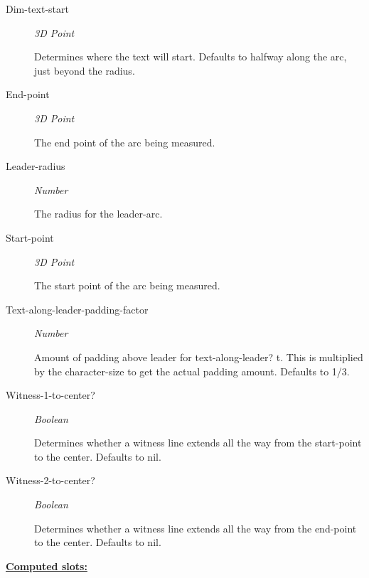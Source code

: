\documentclass [11pt]{book}
\begin{document}
\begin{itemize}
\begin{description}
\item [Dim-text-start]
\emph{3D Point}

 Determines where the text will start. Defaults to halfway along the arc, just beyond the radius.




\item [End-point]
\emph{3D Point}

 The end point of the arc being measured.




\item [Leader-radius]
\emph{Number}

 The radius for the leader-arc.




\item [Start-point]
\emph{3D Point}

 The start point  of the arc being measured.




\item [Text-along-leader-padding-factor]
\emph{Number}

 Amount of padding above leader for text-along-leader? t. This is multiplied by the
character-size to get the actual padding amount. Defaults to 1/3.




\item [Witness-1-to-center?]
\emph{Boolean}

 Determines whether a witness line extends all the way from the start-point to the center.
Defaults to nil.




\item [Witness-2-to-center?]
\emph{Boolean}

 Determines whether a witness line extends all the way from the end-point to the center.
Defaults to nil.




\end{description}






\textbf{
\underline{Computed slots:}}


\end{itemize}
\end{document}
